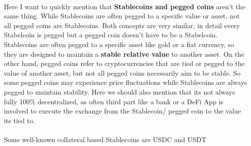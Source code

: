 \documentclass{article}
\begin{document}
\\
Here I want to quickly mention that \textbf{Stablecoins and pegged coins} aren't the same thing. While Stablecoins are often pegged to a specific value or asset, not all pegged coins are Stablecoins. Both concepts are very similar, in detail every Stabelcoin is pegged but a pegged coin doesn't have to be a Stabelcoin. Stablecoins are often pegged to a specific asset like gold or a fiat currency, so they are designed to maintain a \textbf{stable relative value} to another asset. On the other hand, pegged coins refer to cryptocurrencies that are tied or pegged to the value of another asset, but not all pegged coins necessarily aim to be stable. So some pegged coins may experience price fluctuations while Stablecoins are always pegged to maintain stability. Here we should also mention that its not always fully 100\% decentralized, as often  third part like a bank or a DeFi App is involved to execute the exchange from the Stablecoin/ pegged coin  to the value its tied to.\\
\\
Some well-known collateral based Stablecoins are USDC and USDT%
\end{document}
